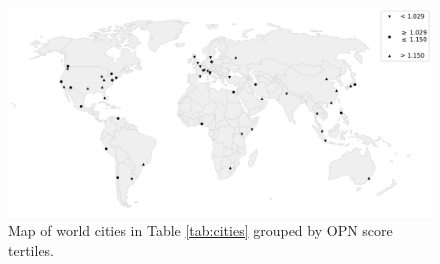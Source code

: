 \documentclass[Afour,sageh,times]{sagej}
\begin{document}
\begin{figure}[htbp]
    \center
    \includegraphics[width=\textwidth]{world_map_bw.png}
    \caption{Map of world cities in Table \ref{tab:cities} grouped by OPN score tertiles.}
    \label{fig:world_map_opn}
\end{figure}
\end{document}
